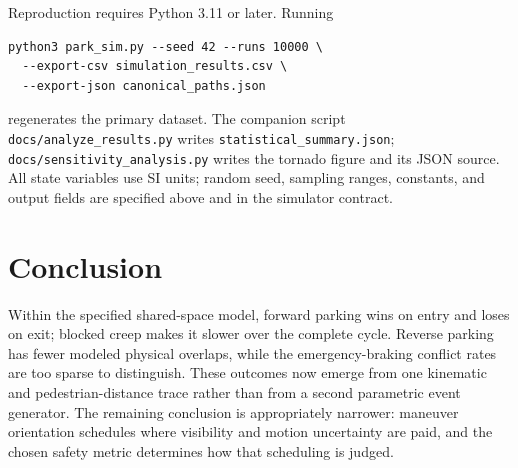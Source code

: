 \documentclass[11pt]{article}
\begin{document}
Reproduction requires Python 3.11 or later. Running
\begin{verbatim}
python3 park_sim.py --seed 42 --runs 10000 \
  --export-csv simulation_results.csv \
  --export-json canonical_paths.json
\end{verbatim}
regenerates the primary dataset. The companion script \texttt{docs/analyze\_results.py} writes \texttt{statistical\_summary.json}; \texttt{docs/sensitivity\_analysis.py} writes the tornado figure and its JSON source. All state variables use SI units; random seed, sampling ranges, constants, and output fields are specified above and in the simulator contract.

\section{Conclusion}

Within the specified shared-space model, forward parking wins on entry and loses on exit; blocked creep makes it slower over the complete cycle. Reverse parking has fewer modeled physical overlaps, while the emergency-braking conflict rates are too sparse to distinguish. These outcomes now emerge from one kinematic and pedestrian-distance trace rather than from a second parametric event generator. The remaining conclusion is appropriately narrower: maneuver orientation schedules where visibility and motion uncertainty are paid, and the chosen safety metric determines how that scheduling is judged.
\end{document}
